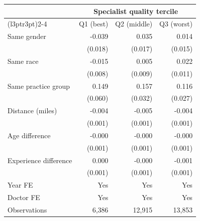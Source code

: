 
\begin{tabular}{lrrr}
\toprule
\multicolumn{1}{c}{ } & \multicolumn{3}{c}{Specialist quality tercile} \\
\cmidrule(l{3pt}r{3pt}){2-4}
 & Q1 (best) & Q2 (middle) & Q3 (worst)\\
\midrule
Same gender & -0.039 & 0.035 & 0.014\\
 & (0.018) & (0.017) & (0.015)\\
Same race & -0.015 & 0.005 & 0.022\\
 & (0.008) & (0.009) & (0.011)\\
Same practice group & 0.149 & 0.157 & 0.116\\
 & (0.060) & (0.032) & (0.027)\\
Distance (miles) & -0.004 & -0.005 & -0.004\\
 & (0.001) & (0.001) & (0.001)\\
Age difference & -0.000 & -0.000 & -0.000\\
 & (0.001) & (0.001) & (0.001)\\
Experience difference & 0.000 & -0.000 & -0.001\\
 & (0.001) & (0.001) & (0.001)\\
Year FE & Yes & Yes & Yes\\
Doctor FE & Yes & Yes & Yes\\
Observations & 6,386 & 12,915 & 13,853\\
\bottomrule
\end{tabular}
